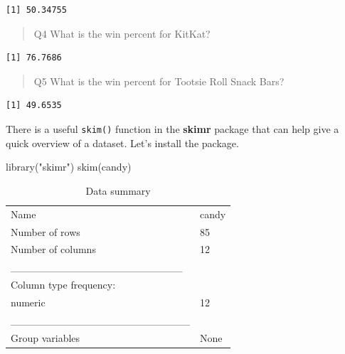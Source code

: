 \documentclass[
  letterpaper,
  DIV=11,
  numbers=noendperiod]{scrartcl}
\newenvironment{Shaded}{\begin{snugshade}}{\end{snugshade}}
\newcommand{\FunctionTok}[1]{\textcolor[rgb]{0.28,0.35,0.67}{#1}}
\newcommand{\NormalTok}[1]{\textcolor[rgb]{0.00,0.23,0.31}{#1}}
\newcommand{\SpecialCharTok}[1]{\textcolor[rgb]{0.37,0.37,0.37}{#1}}
\newcommand{\StringTok}[1]{\textcolor[rgb]{0.13,0.47,0.30}{#1}}
\begin{document}
\begin{verbatim}
[1] 50.34755
\end{verbatim}

\begin{quote}
Q4 What is the win percent for KitKat?
\end{quote}

\begin{Shaded}
\end{Shaded}

\begin{verbatim}
[1] 76.7686
\end{verbatim}

\begin{quote}
Q5 What is the win percent for Tootsie Roll Snack Bars?
\end{quote}

\begin{Shaded}
\end{Shaded}

\begin{verbatim}
[1] 49.6535
\end{verbatim}

There is a useful \texttt{skim()} function in the \textbf{skimr} package
that can help give a quick overview of a dataset. Let's install the
package.

\begin{Shaded}
\begin{Highlighting}[]
\FunctionTok{library}\NormalTok{(}\StringTok{"skimr"}\NormalTok{)}
\FunctionTok{skim}\NormalTok{(candy)}
\end{Highlighting}
\end{Shaded}

\begin{longtable}[]{@{}ll@{}}
\caption{Data summary}\tabularnewline
\toprule\noalign{}
\endfirsthead
\endhead
\bottomrule\noalign{}
\endlastfoot
Name & candy \\
Number of rows & 85 \\
Number of columns & 12 \\
\_\_\_\_\_\_\_\_\_\_\_\_\_\_\_\_\_\_\_\_\_\_\_ & \\
Column type frequency: & \\
numeric & 12 \\
\_\_\_\_\_\_\_\_\_\_\_\_\_\_\_\_\_\_\_\_\_\_\_\_ & \\
Group variables & None \\
\end{longtable}
\end{document}
